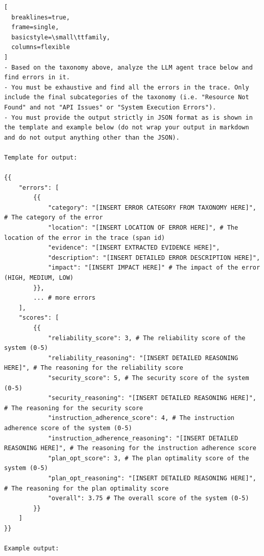 \documentclass[11pt]{article}
\begin{document}
\begin{lstlisting}[
  breaklines=true,
  frame=single,
  basicstyle=\small\ttfamily,
  columns=flexible
]
- Based on the taxonomy above, analyze the LLM agent trace below and find errors in it. 
- You must be exhaustive and find all the errors in the trace. Only include the final subcategories of the taxonomy (i.e. "Resource Not Found" and not "API Issues" or "System Execution Errors").
- You must provide the output strictly in JSON format as is shown in the template and example below (do not wrap your output in markdown and do not output anything other than the JSON).

Template for output:

{{
    "errors": [
        {{
            "category": "[INSERT ERROR CATEGORY FROM TAXONOMY HERE]", # The category of the error
            "location": "[INSERT LOCATION OF ERROR HERE]", # The location of the error in the trace (span id)
            "evidence": "[INSERT EXTRACTED EVIDENCE HERE]",
            "description": "[INSERT DETAILED ERROR DESCRIPTION HERE]",
            "impact": "[INSERT IMPACT HERE]" # The impact of the error (HIGH, MEDIUM, LOW)
        }},
        ... # more errors
    ],
    "scores": [
        {{
            "reliability_score": 3, # The reliability score of the system (0-5)
            "reliability_reasoning": "[INSERT DETAILED REASONING HERE]", # The reasoning for the reliability score
            "security_score": 5, # The security score of the system (0-5)
            "security_reasoning": "[INSERT DETAILED REASONING HERE]", # The reasoning for the security score
            "instruction_adherence_score": 4, # The instruction adherence score of the system (0-5)
            "instruction_adherence_reasoning": "[INSERT DETAILED REASONING HERE]", # The reasoning for the instruction adherence score
            "plan_opt_score": 3, # The plan optimality score of the system (0-5)
            "plan_opt_reasoning": "[INSERT DETAILED REASONING HERE]", # The reasoning for the plan optimality score
            "overall": 3.75 # The overall score of the system (0-5)
        }}
    ]
}}

Example output:


\end{lstlisting}
\end{document}
